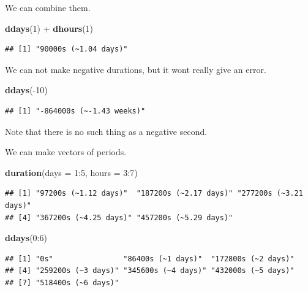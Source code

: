 \documentclass[]{tufte-book}
\newenvironment{Shaded}{}{}
\newcommand{\DataTypeTok}[1]{\textcolor[rgb]{0.56,0.13,0.00}{#1}}
\newcommand{\DecValTok}[1]{\textcolor[rgb]{0.25,0.63,0.44}{#1}}
\newcommand{\KeywordTok}[1]{\textcolor[rgb]{0.00,0.44,0.13}{\textbf{#1}}}
\newcommand{\NormalTok}[1]{#1}
\newcommand{\OperatorTok}[1]{\textcolor[rgb]{0.40,0.40,0.40}{#1}}
\newcommand{\StringTok}[1]{\textcolor[rgb]{0.25,0.44,0.63}{#1}}
\begin{document}
We can combine them.

\begin{Shaded}
\begin{Highlighting}[]
\KeywordTok{ddays}\NormalTok{(}\DecValTok{1}\NormalTok{) }\OperatorTok{+}\StringTok{ }\KeywordTok{dhours}\NormalTok{(}\DecValTok{1}\NormalTok{)}
\end{Highlighting}
\end{Shaded}

\begin{verbatim}
## [1] "90000s (~1.04 days)"
\end{verbatim}

We can not make negative durations, but it wont really give an error.

\begin{Shaded}
\begin{Highlighting}[]
\KeywordTok{ddays}\NormalTok{(}\OperatorTok{-}\DecValTok{10}\NormalTok{)}
\end{Highlighting}
\end{Shaded}

\begin{verbatim}
## [1] "-864000s (~-1.43 weeks)"
\end{verbatim}

Note that there is no such thing as a negative second.

We can make vectors of periods.

\begin{Shaded}
\begin{Highlighting}[]
\KeywordTok{duration}\NormalTok{(}\DataTypeTok{days =} \DecValTok{1}\OperatorTok{:}\DecValTok{5}\NormalTok{, }\DataTypeTok{hours =} \DecValTok{3}\OperatorTok{:}\DecValTok{7}\NormalTok{)}
\end{Highlighting}
\end{Shaded}

\begin{verbatim}
## [1] "97200s (~1.12 days)"  "187200s (~2.17 days)" "277200s (~3.21 days)"
## [4] "367200s (~4.25 days)" "457200s (~5.29 days)"
\end{verbatim}

\begin{Shaded}
\begin{Highlighting}[]
\KeywordTok{ddays}\NormalTok{(}\DecValTok{0}\OperatorTok{:}\DecValTok{6}\NormalTok{)}
\end{Highlighting}
\end{Shaded}

\begin{verbatim}
## [1] "0s"                "86400s (~1 days)"  "172800s (~2 days)"
## [4] "259200s (~3 days)" "345600s (~4 days)" "432000s (~5 days)"
## [7] "518400s (~6 days)"
\end{verbatim}
\end{document}
